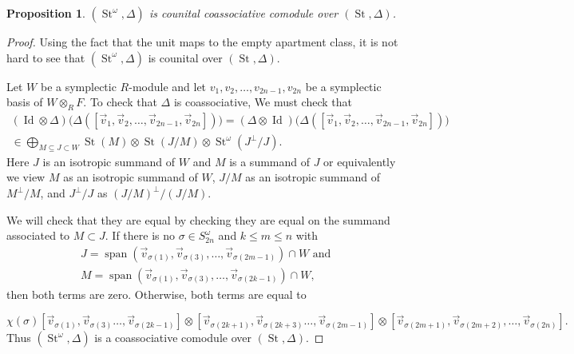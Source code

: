 \documentclass[11pt,letterpaper]{amsart}
\DeclareMathOperator{\Id}{Id}
\DeclareMathOperator{\Span}{span}
\numberwithin{theoremcounter}{section}
\newtheorem{proposition}[propositionauto]{Proposition}
\theoremstyle{definition}
\theoremstyle{remark}
\DeclareMathOperator{\St}{St}
\begin{document}
\begin{proposition}
    $(\St^\omega,\Delta)$ is counital  coassociative comodule over $(\St,\Delta)$. 
\end{proposition}
\begin{proof}
Using the fact that the unit maps to the empty apartment class, it is not hard to see that $(\St^\omega,\Delta)$ is counital over $(\St,\Delta)$.

Let $W$ be a symplectic $R$-module and let  $v_1,v_2, \ldots, v_{2n-1},v_{2n}$ be a symplectic basis of $W \otimes_R F$. To check that $\Delta$ is coassociative, We must check that \begin{multline*}
(\Id \otimes \Delta)\Big(\Delta([\vec v_1,\vec v_2, \ldots, \vec v_{2n-1},\vec v_{2n}])\Big)=(\Delta \otimes \Id)\Big(\Delta([\vec v_1,\vec v_2, \ldots, \vec v_{2n-1},\vec v_{2n}])\Big) \\\in \bigoplus_{M \subseteq J \subset W} \St(M) \otimes \St(J/M) \otimes \St^\omega(J^\perp/J).
\end{multline*}
Here $J$ is an isotropic summand of $W$ and $M$ is a summand of $J$ or equivalently we view $M$ as an isotropic summand of $W$, $J/M$ as an isotropic summand of $M^\perp/M$, and $J^\perp/J$ as $(J/M)^\perp/(J/M)$.

We will check that they are equal by checking they are equal on the summand associated to $M \subset J$. 
If there is  no  $\sigma \in S_{2n}^\omega$ and $k \leq m \leq n$ with 
\begin{gather*} %
    J=\Span(\vec v_{\sigma(1)},\vec v_{\sigma(3)},\ldots,\vec v_{\sigma(2m-1)}) \cap W\text{ and }\\
    M=\Span(\vec v_{\sigma(1)},\vec  v_{\sigma(3)},\ldots,\vec v_{\sigma(2k-1)}) \cap W,
\end{gather*}
then both terms are zero. 
Otherwise, both terms are equal to 


    $$ \chi(\sigma)[\vec v_{\sigma(1)},\vec v_{\sigma(3)}\ldots, \vec v_{\sigma(2k-1)} ] \otimes [\vec v_{\sigma(2k+1)},\vec v_{\sigma(2k+3)}\ldots, \vec v_{\sigma(2m-1)} ]  \otimes [\vec v_{\sigma(2m+1)},\vec v_{\sigma(2m+2)},\ldots, \vec v_{\sigma(2n)} ] . $$  
Thus $(\St^\omega,\Delta)$ is a coassociative comodule over $(\St,\Delta)$.
\end{proof}
\end{document}
